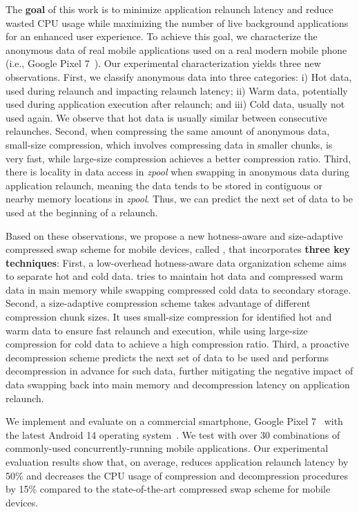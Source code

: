 The \textbf{goal} of this work is to minimize application relaunch latency and reduce wasted CPU  usage while maximizing the number of live background applications for an enhanced user experience.
To achieve this goal, we characterize the anonymous data of real mobile applications used on a real modern mobile phone (i.e., Google Pixel 7~\cite{Pixel7}). Our experimental characterization yields three new observations. First, we classify anonymous data into three categories: i) Hot data, used during relaunch and impacting relaunch latency; ii) Warm data, potentially used during application execution after relaunch; and iii) Cold data, usually not used again. We observe that hot data is usually similar between consecutive relaunches.
Second, when compressing the same amount of anonymous data, small-size compression, which involves compressing data in smaller chunks, is very fast, while large-size compression achieves a better compression ratio.
Third, there is locality in data access in \emph{zpool} when swapping in anonymous data during application relaunch, meaning the data tends to be stored in contiguous or nearby memory locations in \emph{zpool}. Thus, we can predict the next set of data to be used at the beginning of a relaunch.

Based on these observations, we propose a new hotness-aware and size-adaptive compressed swap scheme for mobile devices, called \proposal, that incorporates \textbf{three key techniques}:
First, a low-overhead hotness-aware data organization scheme aims to separate hot and cold data. \proposal tries to maintain hot data and compressed warm data in main memory while swapping compressed cold data to secondary storage.
Second, a size-adaptive compression scheme takes advantage of different compression chunk sizes. It uses small-size compression for identified hot and warm data to ensure fast relaunch and execution, while using large-size compression for cold data to achieve a high compression ratio.
Third, a proactive decompression scheme predicts the next set of data to be used and performs decompression in advance for such data, further mitigating the negative impact of data swapping back into main memory and decompression latency on application relaunch.


We implement and evaluate \proposal on a commercial smartphone,
Google Pixel 7~\cite{Pixel7} with the latest Android 14 operating system~\cite{Android14}.
We test \proposal with over 30 combinations of commonly-used concurrently-running mobile applications. Our experimental evaluation results show that, on average, \proposal reduces application relaunch latency by 50\% and decreases the CPU usage of compression and decompression procedures by 15\% compared to the state-of-the-art compressed swap scheme for mobile devices.

